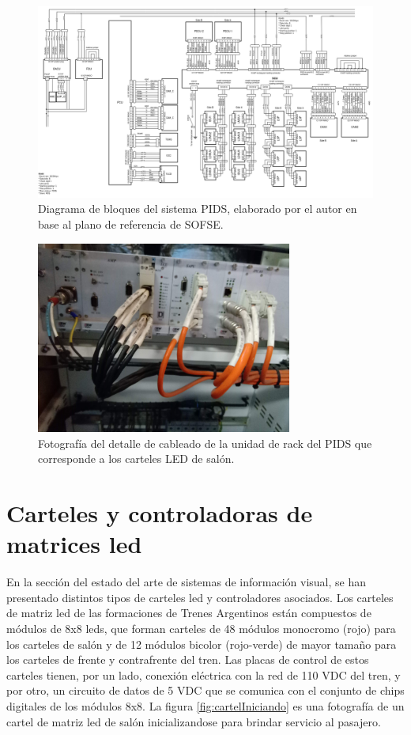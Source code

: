 \begin{figure}[htbp]
	\centering
	\includegraphics[width=1.66\textwidth, angle=90]{./Figures/diagramaPIDS.png}
	\caption{Diagrama de bloques del sistema PIDS, elaborado por el autor en base al plano de referencia de SOFSE.}
	\label{fig:diagramaPIDS}
\end{figure}



\begin{figure}[ht]
	\centering
	\includegraphics[width=0.75\textwidth ]{./Figures/rackPIDS2.jpg}
	\caption{Fotografía del detalle de cableado de la unidad de rack del PIDS que corresponde a los carteles LED de salón.}
	\label{fig:rackPIDS2}
\end{figure}

\section{Carteles y controladoras de matrices led}

En la sección del estado del arte de sistemas de información visual, se han presentado distintos tipos de carteles led y controladores asociados. Los carteles de matriz led de las formaciones de Trenes Argentinos están compuestos de módulos de 8x8 leds, que forman carteles de 48 módulos monocromo (rojo) para los carteles de salón y de 12 módulos bicolor (rojo-verde) de mayor tamaño para los carteles de frente y contrafrente del tren. Las placas de control de estos carteles tienen, por un lado, conexión eléctrica con la red de 110 VDC del tren, y por otro, un circuito de datos de 5 VDC que se comunica con el conjunto de chips digitales de los módulos 8x8. La figura \ref{fig:cartelIniciando} es una fotografía de un cartel de matriz led de salón inicializandose para brindar servicio al pasajero.\\

